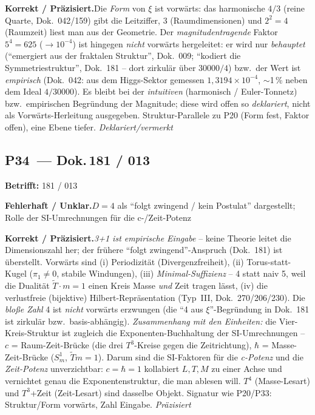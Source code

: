 \smallskip\noindent\textbf{Korrekt / Präzisiert.}\quad Die \emph{Form} von $\xi$ ist vorwärts: das harmonische $4/3$ (reine Quarte, Dok.~042/159) gibt die Leitziffer, $3$ (Raumdimensionen) und $2^2{=}4$ (Raumzeit) liest man aus der Geometrie. Der \emph{magnitudentragende} Faktor $5^4{=}625$ ($\to 10^{-4}$) ist hingegen \emph{nicht} vorwärts hergeleitet: er wird nur \emph{behauptet} (\enquote{emergiert aus der fraktalen Struktur}, Dok.~009; \enquote{kodiert die Symmetriestruktur}, Dok.~181 -- dort zirkulär über $30000/4$) bzw.\ der Wert ist \emph{empirisch} (Dok.~042: aus dem Higgs-Sektor gemessen $1{,}3194\times10^{-4}$, $\sim$1\,\% neben dem Ideal $4/30000$). Es bleibt bei der \emph{intuitiven} (harmonisch / Euler-Tonnetz) bzw.\ empirischen Begründung der Magnitude; diese wird offen so \emph{deklariert}, nicht als Vorwärts-Herleitung ausgegeben. Struktur-Parallele zu P20 (Form fest, Faktor offen), eine Ebene tiefer. \emph{Deklariert/vermerkt}


\medskip


\subsection*{P34~--- Dok.\,181 / 013}

\noindent\textbf{Betrifft:} 181 / 013


\smallskip\noindent\textbf{Fehlerhaft / Unklar.}\quad $D=4$ als \enquote{folgt zwingend / kein Postulat} dargestellt; Rolle der SI-Umrechnungen für die c-/Zeit-Potenz


\smallskip\noindent\textbf{Korrekt / Präzisiert.}\quad \emph{3+1 ist empirische Eingabe} -- keine Theorie leitet die Dimensionszahl her; der frühere \enquote{folgt zwingend}-Anspruch (Dok.~181) ist überstellt. Vorwärts sind (i) Periodizität (Divergenzfreiheit), (ii) Torus-statt-Kugel ($\pi_1\neq0$, stabile Windungen), (iii) \emph{Minimal-Suffizienz} -- 4 statt naiv 5, weil die Dualität $\tilde T\cdot m=1$ einen Kreis Masse \emph{und} Zeit tragen lässt, (iv) die verlustfreie (bijektive) Hilbert-Repräsentation (Typ~III, Dok.~270/206/230). Die \emph{bloße Zahl} 4 ist \emph{nicht} vorwärts erzwungen (die \enquote{4 aus $\xi$}-Begründung in Dok.~181 ist zirkulär bzw.\ basis-abhängig). \emph{Zusammenhang mit den Einheiten:} die Vier-Kreis-Struktur ist zugleich die Exponenten-Buchhaltung der SI-Umrechnungen -- $c$ = Raum-Zeit-Brücke (die drei $T^3$-Kreise gegen die Zeitrichtung), $\hbar$ = Masse-Zeit-Brücke ($S^1_m$, $\tilde T m=1$). Darum sind die SI-Faktoren für die \emph{c-Potenz} und die \emph{Zeit-Potenz} unverzichtbar: $c=\hbar=1$ kollabiert $L,T,M$ zu einer Achse und vernichtet genau die Exponentenstruktur, die man ablesen will. $T^4$ (Masse-Lesart) und $T^3$+Zeit (Zeit-Lesart) sind dasselbe Objekt. Signatur wie P20/P33: Struktur/Form vorwärts, Zahl Eingabe. \emph{Präzisiert}


